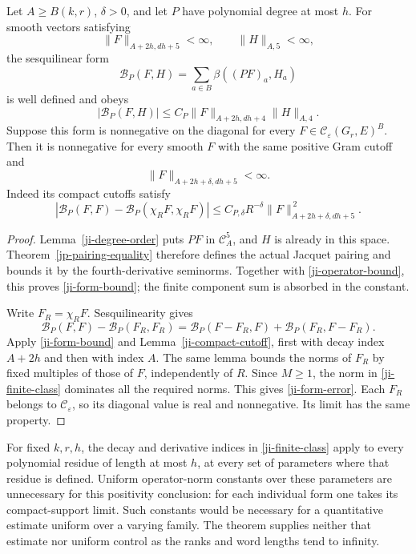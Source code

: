 \begin{theorem}\label{ji-finite-decay-positivity}
Let \(A\geq B(k,r)\), \(\delta>0\), and let \(P\) have
polynomial degree at most \(h\).  For smooth vectors satisfying
\[
             \|F\|_{A+2h,dh+5}<\infty,
             \qquad\|H\|_{A,5}<\infty,
\]
the sesquilinear form
\[
       \mathcal B_P(F,H)=\sum_{a\in B}\beta((PF)_a,H_a)
\]
is well defined and obeys
\begin{equation}\label{ji-form-bound}
 |\mathcal B_P(F,H)|
       \leq C_P\|F\|_{A+2h,dh+4}\|H\|_{A,4}.
\end{equation}
Suppose this form is nonnegative on the diagonal for every
\(F\in\mathscr C_\varepsilon(G_r,E)^B\).
Then it is nonnegative for every smooth \(F\) with the same
positive Gram cutoff and
\begin{equation}\label{ji-finite-class}
                    \|F\|_{A+2h+\delta,dh+5}<\infty.
\end{equation}
Indeed its compact cutoffs satisfy
\begin{equation}\label{ji-form-error}
 |\mathcal B_P(F,F)-\mathcal B_P(\chi_RF,\chi_RF)|
       \leq C_{P,\delta}R^{-\delta}
                             \|F\|_{A+2h+\delta,dh+5}^{\,2}.
\end{equation}
\end{theorem}

\begin{proof}
Lemma~\ref{ji-degree-order} puts \(PF\) in
\(\mathcal C_A^5\), and \(H\) is already in this space.
Theorem~\ref{jp-pairing-equality} therefore defines the actual
Jacquet pairing and bounds it by the fourth-derivative seminorms.
Together with \eqref{ji-operator-bound}, this proves
\eqref{ji-form-bound}; the finite component sum is absorbed in
the constant.

Write \(F_R=\chi_RF\).  Sesquilinearity gives
\[
 \mathcal B_P(F,F)-\mathcal B_P(F_R,F_R)
       =\mathcal B_P(F-F_R,F)+\mathcal B_P(F_R,F-F_R).
\]
Apply \eqref{ji-form-bound} and
Lemma~\ref{ji-compact-cutoff}, first with decay index \(A+2h\)
and then with index \(A\).  The same lemma bounds the norms of
\(F_R\) by fixed multiples of those of \(F\), independently
of \(R\).  Since \(M\geq1\), the norm in
\eqref{ji-finite-class} dominates all the required norms.  This
gives \eqref{ji-form-error}.  Each \(F_R\) belongs to
\(\mathscr C_\varepsilon\), so its diagonal value is real and
nonnegative.  Its limit has the same property.
\end{proof}

For fixed \(k,r,h\), the decay and derivative indices in
\eqref{ji-finite-class} apply to every polynomial residue of
length at most \(h\), at every set of parameters where that
residue is defined.  Uniform operator-norm constants over these
parameters are unnecessary for this positivity conclusion: for
each individual form one takes its compact-support limit.  Such
constants would be necessary for a quantitative estimate uniform
over a varying family.  The theorem supplies neither that estimate
nor uniform control as the ranks and word lengths tend to infinity.

